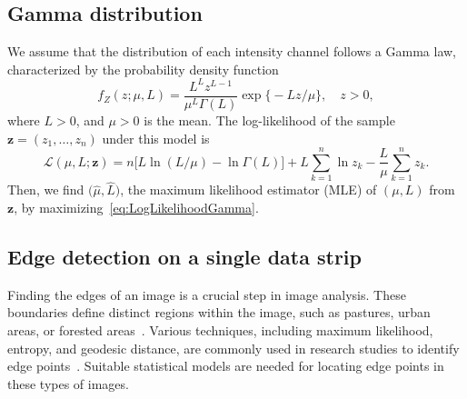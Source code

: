 \documentclass{article}
\DeclareMathOperator{\Tr}{Tr}
\begin{document}
\subsection{Gamma distribution}

We assume that the distribution of each intensity channel  follows a Gamma law, characterized by the probability density function
\begin{equation}
f_Z(z;\mu,L)=\frac{L^{L}z^{L-1}}{\mu^{L}\Gamma(L)} \exp\big\{-Lz/\mu\big\},\quad z>0,
\label{func_dens_uni_gamma}
\end{equation}
where $L>0$, and
$\mu>0$ is the mean.
The log-likelihood of the sample $\bm{z} = (z_1,\dots,z_n)$ under this model is
\begin{equation}
\mathcal{L}(\mu, L; \bm{z}) = 
n \big[L\ln (L / \mu) - \ln \Gamma(L)\big]
+L \sum_{k=1}^{n}\ln z_k -\frac{L}{\mu}\sum_{k=1}^{n} z_k.
\label{eq:LogLikelihoodGamma}
\end{equation}
Then, we find $\big(\widehat \mu, \widehat L\big)$, the maximum likelihood estimator (MLE) of $(\mu, L)$ from $\bm{z}$, by maximizing~\eqref{eq:LogLikelihoodGamma}.

\subsection{Edge detection on a single data strip}
Finding the edges of an image is a crucial step in image analysis. These boundaries define distinct regions within the image, such as pastures, urban areas, or forested areas~\cite{monferran2020modelo}. Various techniques, including maximum likelihood, entropy, and geodesic distance, are commonly used in research studies to identify edge points~\cite{NaranjoTorres2017,Nascimento2019}. 
Suitable statistical models are needed for locating edge points in these types of images.
\end{document}
